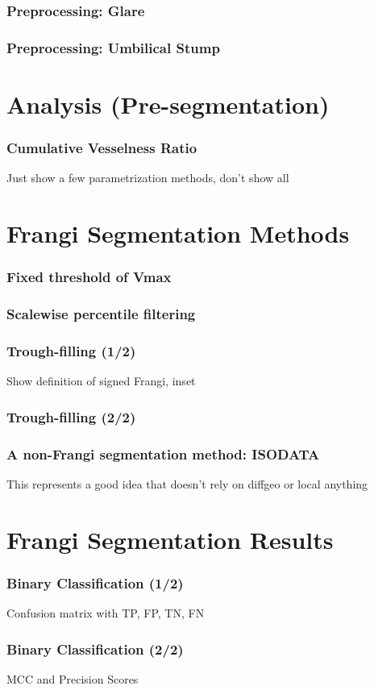 \documentclass[9pt,notes]{beamer}
\begin{document}
\begin{frame}
\frametitle{Preprocessing: Glare}
\end{frame}

\begin{frame}
\frametitle{Preprocessing: Umbilical Stump}
\end{frame}

\section{Analysis (Pre-segmentation)}

\begin{frame}
\frametitle{Cumulative Vesselness Ratio}
Just show a few parametrization methods, don't show all
\end{frame}

\section{Frangi Segmentation Methods}
\begin{frame}
\frametitle{Fixed threshold of Vmax}
\end{frame}

\begin{frame}
\frametitle{Scalewise percentile filtering}
\end{frame}

\begin{frame}
\frametitle{Trough-filling (1/2)}
Show definition of signed Frangi, inset
\end{frame}

\begin{frame}
\frametitle{Trough-filling (2/2)}
\end{frame}

\begin{frame}
\frametitle{A non-Frangi segmentation method: ISODATA}
This represents a good idea that doesn't rely on diffgeo or local anything
\end{frame}

\section{Frangi Segmentation Results}
\begin{frame}
\frametitle{Binary Classification (1/2)}
Confusion matrix with TP, FP, TN, FN
\end{frame}

\begin{frame}
\frametitle{Binary Classification (2/2)}
MCC and Precision Scores
\end{frame}
\end{document}
